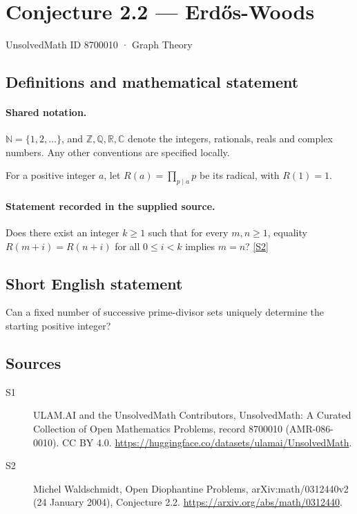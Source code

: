 \documentclass[11pt]{article}
\newcommand{\sref}[2]{\hyperlink{source:#1:#2}{[S#2]}}
\begin{document}
\setcounter{section}{8700009}
\section{Conjecture 2.2 — Erdős-Woods}\label{8700010}
{\small\sffamily UnsolvedMath ID 8700010 · Graph Theory}
\subsection{Definitions and mathematical statement}

\paragraph{Shared notation.}$\mathbb N=\{1,2,\ldots\}$, and $\mathbb Z,\mathbb Q,\mathbb R,\mathbb C$ denote the integers, rationals, reals and complex numbers. Any other conventions are specified locally.


For a positive integer $a$, let $R(a)=\prod_{p\mid a}p$ be its radical, with $R(1)=1$.
\paragraph{Statement recorded in the supplied source.}
Does there exist an integer $k\ge1$ such that for every $m,n\ge1$, equality $R(m+i)=R(n+i)$ for all $0\le i<k$ implies $m=n$? \sref{8700010}{2}
\subsection{Short English statement}
Can a fixed number of successive prime-divisor sets uniquely determine the starting positive integer?
\subsection{Sources}
\begin{description}
\item[\hypertarget{source:8700010:1}{S1}] ULAM.AI and the UnsolvedMath Contributors, UnsolvedMath: A Curated Collection of Open Mathematics Problems, record 8700010 (AMR-086-0010). CC BY 4.0. \url{https://huggingface.co/datasets/ulamai/UnsolvedMath}.
\item[\hypertarget{source:8700010:2}{S2}] Michel Waldschmidt, Open Diophantine Problems, arXiv:math/0312440v2 (24 January 2004), Conjecture 2.2. \url{https://arxiv.org/abs/math/0312440}.
\end{description}
\label{end:8700010}
\end{document}
